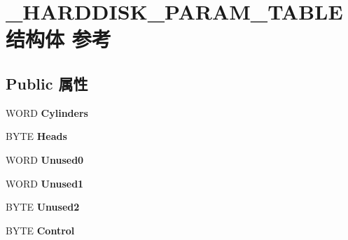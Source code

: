 \hypertarget{struct___h_a_r_d_d_i_s_k___p_a_r_a_m___t_a_b_l_e}{}\section{\+\_\+\+H\+A\+R\+D\+D\+I\+S\+K\+\_\+\+P\+A\+R\+A\+M\+\_\+\+T\+A\+B\+L\+E结构体 参考}
\label{struct___h_a_r_d_d_i_s_k___p_a_r_a_m___t_a_b_l_e}
\subsection*{Public 属性}
\begin{DoxyCompactItemize}
\item 
\mbox{\label{struct___h_a_r_d_d_i_s_k___p_a_r_a_m___t_a_b_l_e_ae184affa71760d2cf30a27d8d1649ecd}} 
W\+O\+RD {\bfseries Cylinders}
\item 
\mbox{\label{struct___h_a_r_d_d_i_s_k___p_a_r_a_m___t_a_b_l_e_a16e8e6bcd45e8d83ab26d2f9cea47087}} 
B\+Y\+TE {\bfseries Heads}
\item 
\mbox{\label{struct___h_a_r_d_d_i_s_k___p_a_r_a_m___t_a_b_l_e_a4e5a96d4b4ef96aaff0bff3c83c98431}} 
W\+O\+RD {\bfseries Unused0}
\item 
\mbox{\label{struct___h_a_r_d_d_i_s_k___p_a_r_a_m___t_a_b_l_e_a326507de4826b30f26e70f69d3c0d913}} 
W\+O\+RD {\bfseries Unused1}
\item 
\mbox{\label{struct___h_a_r_d_d_i_s_k___p_a_r_a_m___t_a_b_l_e_a548c5ba294dd8fc8203135acc83edc6e}} 
B\+Y\+TE {\bfseries Unused2}
\item 
\mbox{\label{struct___h_a_r_d_d_i_s_k___p_a_r_a_m___t_a_b_l_e_a861ee19050a08478d680a6598af3532c}} 
B\+Y\+TE {\bfseries Control}
\item 
\mbox{\label{struct___h_a_r_d_d_i_s_k___p_a_r_a_m___t_a_b_l_e_a712ebc110546b9758ad9d92f04e498d6}} 

\end{DoxyCompactItemize}
